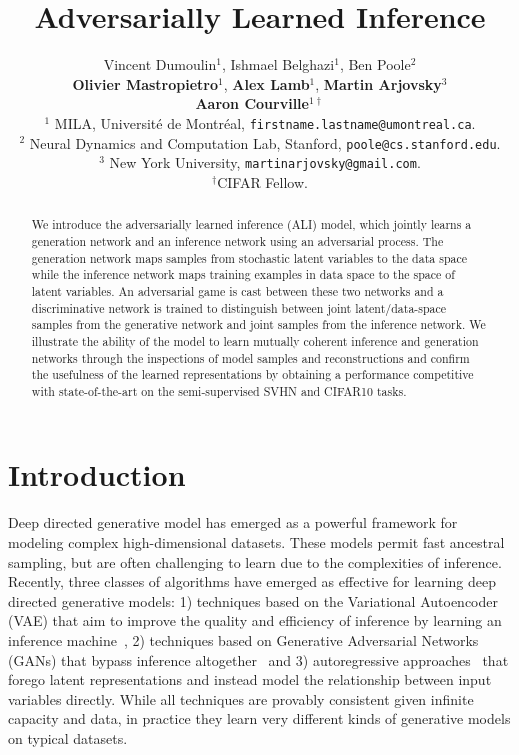 \documentclass{article}
\title{Adversarially Learned Inference}
\author{
  Vincent Dumoulin$^{1}$, Ishmael Belghazi$^{1}$, Ben Poole$^{2}$\\
  {\bf Olivier Mastropietro$^{1}$}, {\bf Alex Lamb$^{1}$}, {\bf Martin Arjovsky$^{3}$}\\
  {\bf Aaron Courville$^{1\dagger}$}\\
  $^1$ MILA, Universit\'e de Montr\'eal, \texttt{firstname.lastname@umontreal.ca}.\\
  $^2$ Neural Dynamics and Computation Lab, Stanford, \texttt{poole@cs.stanford.edu}. \\
  $^3$ New York University, \texttt{martinarjovsky@gmail.com}. \\
  $^\dagger$CIFAR Fellow.\\
}
\begin{document}
\maketitle

\begin{abstract}
We introduce the adversarially learned inference (ALI) model, which jointly
learns a generation network and an inference network using an adversarial
process. The generation network maps samples from stochastic latent variables to
the data space while the inference network maps training examples in data space
to the space of latent variables. An adversarial game is cast between these two
networks and a discriminative network is trained to distinguish between
joint latent/data-space samples from the generative network and joint samples
from the inference network.  We illustrate the ability of the model to learn
mutually coherent inference and generation networks through the inspections of
model samples and reconstructions and confirm the usefulness of the learned
representations by obtaining a performance competitive with state-of-the-art
on the semi-supervised SVHN and CIFAR10 tasks.
\end{abstract}

\section{Introduction}

Deep directed generative model has emerged as a powerful framework for modeling
complex high-dimensional datasets. These models permit fast ancestral sampling,
but are often challenging to learn due to the complexities of inference.
Recently, three classes of algorithms have emerged as effective for learning
deep directed generative models: 1) techniques based on the Variational
Autoencoder (VAE) that aim to improve the quality and efficiency of inference by
learning an inference machine~\citep{kingma2013auto,rezende2014stochastic}, 2)
techniques based on Generative Adversarial Networks (GANs) that bypass inference
altogether~\citep{goodfellow2014generative} and 3) autoregressive
approaches~\citep{van2016pixel,van2016pixelcnn,van2016wavenet} that forego
latent representations and instead model the relationship between input
variables directly. While all techniques are provably consistent given infinite
capacity and data, in practice they learn very different kinds of generative
models on typical datasets.
\end{document}
